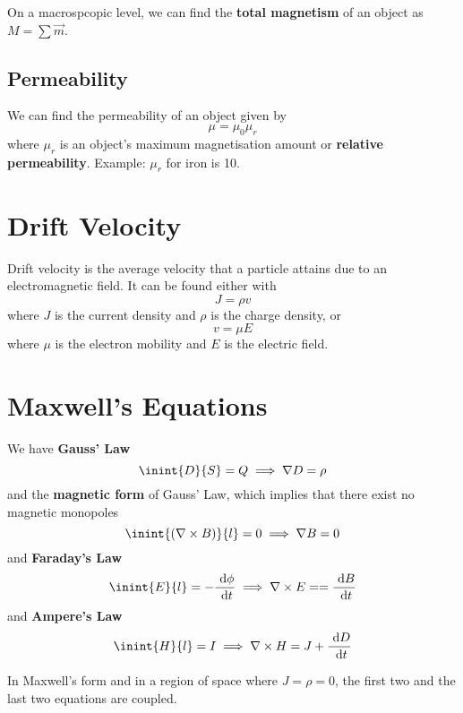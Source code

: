 \documentclass[12pt]{article}
\begin{document}
On a macrospcopic level, we can find the {\bf total magnetism} of an object as $M = \sum \vec{m}$.

\subsection*{Permeability}
We can find the permeability of an object given by \[ \mu = \mu_0 \mu_r \] where $\mu_r$ is an object's maximum magnetisation amount or {\bf relative permeability}. Example: $\mu_r$ for iron is 10.

\section*{Drift Velocity}
Drift velocity is the average velocity that a particle attains due to an electromagnetic field. It can be found either with \[ J = \rho v \] where $J$ is the current density and $\rho$ is the charge density, or \[ v = \mu E \] where $\mu$ is the electron mobility and $E$ is the electric field.

\section*{Maxwell's Equations}
We have {\bf Gauss' Law} \[ \inint{D}{S} = Q \implies \nabla D = \rho \] and the {\bf magnetic form} of Gauss' Law, which implies that there exist no magnetic monopoles \[ \inint{(\nabla \times B)}{l} = 0 \implies \nabla B = 0 \] and {\bf Faraday's Law} \[ \inint{E}{l} = -\frac{\dd \phi}{\dd t} \implies \nabla \times E = =\frac{\dd B}{\dd t} \] and {\bf Ampere's Law} \[ \inint{H}{l} = I \implies \nabla \times H = J + \frac{\dd D}{\dd t} \]

In Maxwell's form and in a region of space where $J = \rho = 0$, the first two and the last two equations are coupled.
\end{document}
